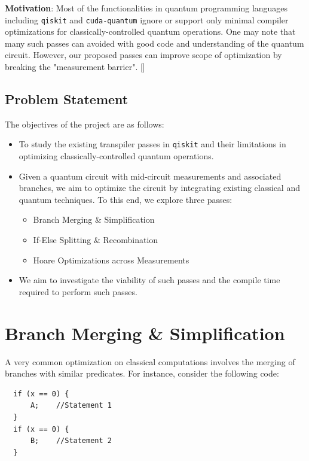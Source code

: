 \documentclass[10pt]{article}
\begin{document}
\textbf{Motivation}: Most of the functionalities in quantum programming languages including \texttt{qiskit} and \texttt{cuda-quantum} ignore or support only minimal compiler optimizations for classically-controlled quantum operations. One may note that many such passes can avoided with good code and understanding of the quantum circuit. However, our proposed passes can improve scope of optimization by breaking the "measurement barrier". [\cite{branch}]

\subsection{Problem Statement}
The objectives of the project are as follows:
\begin{itemize}
  \item To study the existing transpiler passes in \texttt{qiskit} and their limitations in optimizing classically-controlled quantum operations.

  \item Given a quantum circuit with mid-circuit measurements and associated branches, we aim to optimize the circuit by integrating existing classical and quantum techniques. To this end, we explore three passes:
    \begin{itemize}
      \item Branch Merging \& Simplification
      \item If-Else Splitting \& Recombination 
      \item Hoare Optimizations across Measurements
    \end{itemize}

  \item We aim to investigate the viability of such passes and the compile time required to perform such passes.
\end{itemize}


\section{Branch Merging \& Simplification}
A very common optimization on classical computations involves the merging of branches with similar predicates. For instance, consider the following code:
\begin{center}
\begin{BVerbatim}
  if (x == 0) {
      A;    //Statement 1
  }
  if (x == 0) {
      B;    //Statement 2
  }
\end{BVerbatim}
\end{center}
\end{document}
